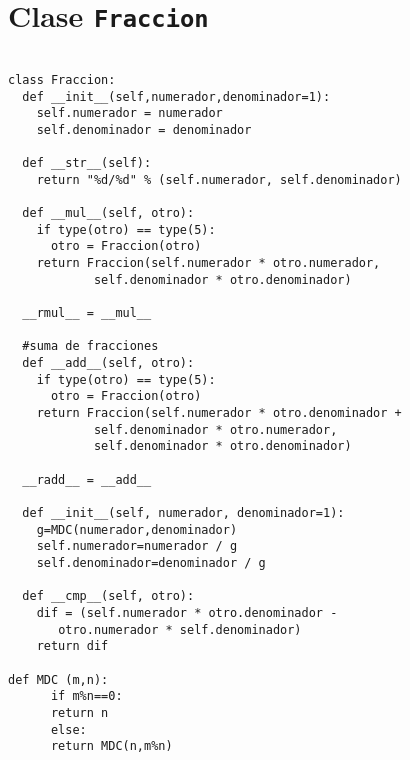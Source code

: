 \section{Clase \texttt{Fraccion}}

\beforeverb
\begin{verbatim}

class Fraccion:
  def __init__(self,numerador,denominador=1):
    self.numerador = numerador
    self.denominador = denominador

  def __str__(self):
    return "%d/%d" % (self.numerador, self.denominador)
  
  def __mul__(self, otro):
    if type(otro) == type(5):
      otro = Fraccion(otro)
    return Fraccion(self.numerador * otro.numerador,
		    self.denominador * otro.denominador)
  
  __rmul__ = __mul__ 

  #suma de fracciones
  def __add__(self, otro):
    if type(otro) == type(5):
      otro = Fraccion(otro)
    return Fraccion(self.numerador * otro.denominador +
		    self.denominador * otro.numerador,
		    self.denominador * otro.denominador)
  
  __radd__ = __add__
  
  def __init__(self, numerador, denominador=1):      
    g=MDC(numerador,denominador)
    self.numerador=numerador / g
    self.denominador=denominador / g
  
  def __cmp__(self, otro):
    dif = (self.numerador * otro.denominador -
	   otro.numerador * self.denominador)
    return dif

def MDC (m,n):
      if m%n==0:
	  return n
      else:
	  return MDC(n,m%n)
\end{verbatim}
\afterverb

